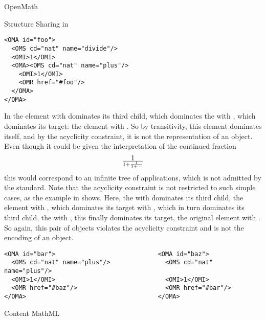 \begin{omgroup}[id=mobj,short=Mathematical Objects]
\begin{omgroup}[id=openmath]{OpenMath}
\begin{module}[id=OpenMath]
\begin{omgroup}[id=om.structure-sharing]{Structure Sharing in {\openmath}}
\begin{lstlisting}[language=OpenMath,numbers=none,label=lst:chained-fraction,
  caption={A Simple Cycle},
  index={OMR,OMA}]
<OMA id="foo">
  <OMS cd="nat" name="divide"/>
  <OMI>1</OMI>
  <OMA><OMS cd="nat" name="plus"/>
    <OMI>1</OMI>
    <OMR href="#foo"/>
  </OMA> 
</OMA>
\end{lstlisting}
In {} the  element with {}
dominates its third child, which dominates the  with
{}, which dominates its target: the  element
with {}. So by transitivity, this element dominates itself, and by
the acyclicity constraint, it is not the {\xml} representation of an {\openmath}
object.  Even though it could be given the interpretation of the continued
fraction
\[1\over{1 + {1\over {1+\cdots}}}\] this would correspond to an infinite tree of
applications, which is not admitted by the {\openmath} standard. Note that the acyclicity
constraint is not restricted to such simple cases, as the example in {}
shows.  Here, the  with {} dominates its
third child, the  element with {}, which
dominates its target  with {}, which in
turn dominates its third child, the  with
{}, this finally dominates its target, the original
 element with {}. So again, this pair of
{\openmath} objects violates the acyclicity constraint and is not the {\xml} encoding of
an {\openmath} object.
\begin{lstlisting}[language=OpenMath,numbers=none,label=lst:2cycle,
  caption={A Cycle of Order Two},index={OMA,OMR}]
<OMA id="bar">                            <OMA id="baz">
  <OMS cd="nat" name="plus"/>               <OMS cd="nat" name="plus"/>
  <OMI>1</OMI>                              <OMI>1</OMI>
  <OMR href="#baz"/>                        <OMR href="#bar"/>
</OMA>                                    </OMA>
\end{lstlisting}
\end{omgroup}
\end{module}
\end{omgroup}

\begin{omgroup}[id=cmml]{Content MathML}
\begin{module}[id=cMathML]


\end{module}
\end{omgroup}
\end{omgroup}
